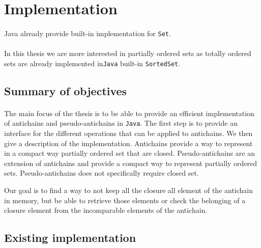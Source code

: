 \documentclass[letterpaper]{article}
\theoremstyle{definition}
\begin{document}
\section{Implementation}

\paragraph{}

Java already provide built-in implementation for \texttt{Set}.

\paragraph{}

In this thesis we are more interested in partially ordered sets as
totally ordered sets are already implemented
in\texttt{Java} built-in
\texttt{SortedSet}.

\subsection{Summary of objectives}


\paragraph{}


The main focus of the thesis is to be able to provide an efficient
implementation of antichains and pseudo-antichains in \texttt{Java}.
The first step is to provide an interface for the different operations that
can be applied to antichains. We then give a description
of the implementation.
Antichains provide a way to represent
in a compact way partially ordered set that are closed. Pseudo-antichains
are an extension of antichains and provide a compact way to represent
partially ordered sets. Pseudo-antichains does not specifically require
closed set.

Our goal is to find a way to not keep all the closure all
element of the antichain in memory, but be able to retrieve those elements
or check the belonging of a closure element from the incomparable elements
of the antichain.

\subsection{Existing implementation}
\end{document}
